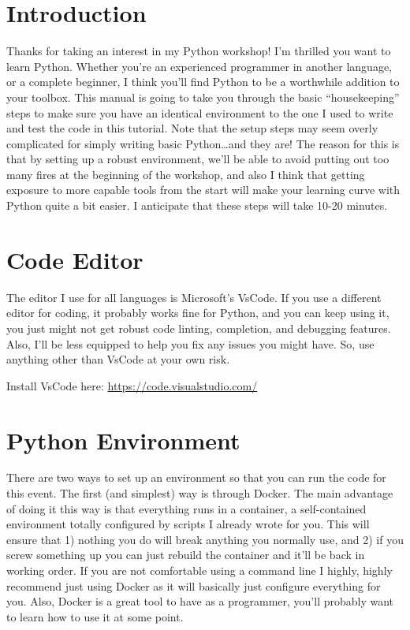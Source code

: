 \documentclass[12pt]{article}
\author{Richard Morrill\\
\small{Fordham University CS Society}}
\begin{document}
    \section{Introduction}
    Thanks for taking an interest in my Python workshop!  I'm thrilled
    you want to learn Python.  Whether you're an experienced programmer
    in another language, or a complete beginner, I think you'll find Python
    to be a worthwhile addition to your toolbox.  This manual is going to
    take you through the basic ``housekeeping'' steps to make sure you have
    an identical environment to the one I used to write and test the code
    in this tutorial.  Note that the setup steps may seem overly complicated
    for simply writing basic Python\dots and they are!  The reason for this
    is that by setting up a robust environment, we'll be able to avoid putting
    out too many fires at the beginning of the workshop, and also I think
    that getting exposure to more capable tools from the start will make
    your learning curve with Python quite a bit easier.  I anticipate that
    these steps will take 10-20 minutes.

    \section{Code Editor}
    The editor I use for all languages is Microsoft's VsCode.  If you use
    a different editor for coding, it probably works fine for Python, and
    you can keep using it, you just might not get robust code linting,
    completion, and debugging features. Also, I'll be less equipped to help
    you fix any issues you might have.  So, use anything other than VsCode
    at your own risk.

    Install VsCode here: \url{https://code.visualstudio.com/}

    \section{Python Environment}
    There are two ways to set up an environment so that you can run the code
    for this event.  The first (and simplest) way is through Docker. The main
    advantage of doing it this way is that everything runs in a container, a
    self-contained environment totally configured by scripts I already wrote
    for you.  This will ensure that 1) nothing you do will break anything
    you normally use, and 2) if you screw something up you can just rebuild
    the container and it'll be back in working order.  If you are not
    comfortable using a command line I highly, highly recommend just using
    Docker as it will basically just configure everything for you.  Also,
    Docker is a great tool to have as a programmer, you'll probably want to
    learn how to use it at some point.
\end{document}
